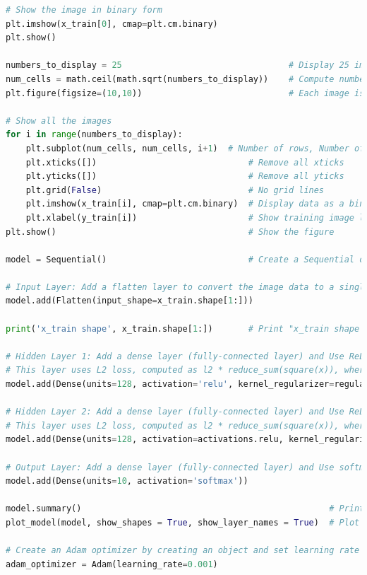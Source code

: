 \documentclass{book}
\begin{document}
\begin{lstlisting}[language=Python, basicstyle=\ttfamily\small, keywordstyle=\color{blue}, commentstyle=\color{forestgreen}, stringstyle=\color{red}, showstringspaces=false]
# Show the image in binary form
plt.imshow(x_train[0], cmap=plt.cm.binary)
plt.show()

numbers_to_display = 25                                 # Display 25 images
num_cells = math.ceil(math.sqrt(numbers_to_display))    # Compute number of images per row
plt.figure(figsize=(10,10))                             # Each image is in 10x10 pixels

# Show all the images
for i in range(numbers_to_display):
    plt.subplot(num_cells, num_cells, i+1)  # Number of rows, Number of columns & Index (Start from 1)
    plt.xticks([])                              # Remove all xticks
    plt.yticks([])                              # Remove all yticks
    plt.grid(False)                             # No grid lines
    plt.imshow(x_train[i], cmap=plt.cm.binary)  # Display data as a binary image
    plt.xlabel(y_train[i])                      # Show training image labels
plt.show()                                      # Show the figure

model = Sequential()                            # Create a Sequential object

# Input Layer: Add a flatten layer to convert the image data to a single column
model.add(Flatten(input_shape=x_train.shape[1:]))

print('x_train shape', x_train.shape[1:])       # Print "x_train shape (28, 28)"

# Hidden Layer 1: Add a dense layer (fully-connected layer) and Use ReLU activation function.
# This layer uses L2 loss, computed as l2 * reduce_sum(square(x)), where l2 is 0.002
model.add(Dense(units=128, activation='relu', kernel_regularizer=regularizers.l2(0.002)))

# Hidden Layer 2: Add a dense layer (fully-connected layer) and Use ReLU activation function.
# This layer uses L2 loss, computed as l2 * reduce_sum(square(x)), where l2 is 0.002
model.add(Dense(units=128, activation=activations.relu, kernel_regularizer=regularizers.l2(0.002)))

# Output Layer: Add a dense layer (fully-connected layer) and Use softmax activation function.
model.add(Dense(units=10, activation='softmax'))

model.summary()                                                 # Print the model summary
plot_model(model, show_shapes = True, show_layer_names = True)  # Plot the model

# Create an Adam optimizer by creating an object and set learning rate to 0.001
adam_optimizer = Adam(learning_rate=0.001)


\end{lstlisting}
\end{document}
